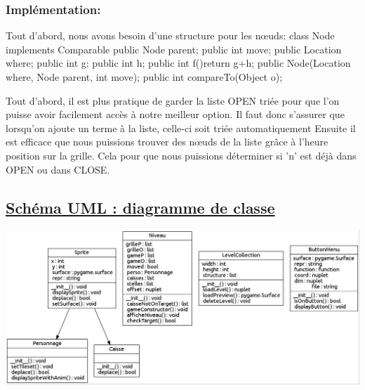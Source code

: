 \documentclass{article}
\begin{document}
\subsubsection{Implémentation:}
\vspace{0.5 cm}

Tout d'abord, nous avons besoin d'une structure pour les nœuds: \newline
class Node implements Comparable {\newline
public Node parent;\newline
public int move;\newline
public Location where;\newline
public int g;\newline
public int h;\newline
public int f(){return g+h;}\newline
public Node(Location where, Node parent, int move);\newline
public int compareTo(Object o);
}\newline


Tout d'abord, il est plus pratique de garder la liste OPEN triée pour que l'on puisse avoir facilement accès à notre meilleur option. Il faut donc s'assurer que lorsqu'on ajoute un terme à la liste, celle-ci soit triée automatiquement  \newline
Ensuite il est efficace que nous puissions trouver des nœuds de la liste grâce à l'heure position sur la grille. Cela pour que nous puissions déterminer si 'n' est déjà dans OPEN ou dans CLOSE.


	\newpage	
		
		
		
\begin{center}
	\section{\underline{Schéma UML : diagramme de classe}}
\end{center}
\begin{center}
\vspace{ 4 cm}
\includegraphics[scale=0.4]{img/dia.jpg}
\end{center}
\newpage
\end{document}
